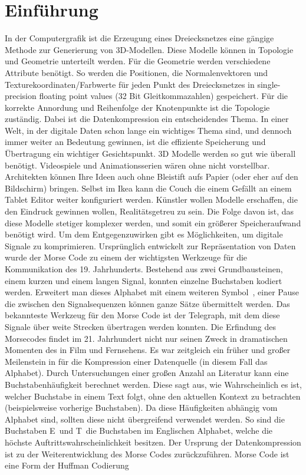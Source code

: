 \section{Einführung}

In der Computergrafik ist die Erzeugung eines Dreiecksnetzes eine gängige Methode zur Generierung von 3D-Modellen. Diese Modelle können in Topologie und Geometrie unterteilt werden. Für die Geometrie werden verschiedene Attribute benötigt. 
So werden die Positionen, die Normalenvektoren und Texturekoordinaten/Farbwerte für jeden Punkt des Dreiecksnetzes in single-precision floating point values (32 Bit Gleitkommazahlen) gespeichert. 
Für die korrekte Annordung und Reihenfolge der Knotenpunkte ist die Topologie zuständig. 
Dabei ist die Datenkompression ein entscheidendes Thema. 
In einer Welt, in der digitale Daten schon lange ein wichtiges Thema sind, und dennoch immer weiter an Bedeutung gewinnen, ist die effiziente Speicherung und Übertragung ein wichtiger Gesichtspunkt.
3D Modelle werden so gut wie überall benötigt. Videospiele und Animationsserien wären ohne nicht vorstellbar. Architekten können Ihre Ideen auch ohne Bleistift aufs Papier (oder eher auf den Bildschirm) bringen. Selbst im Ikea kann die Couch die einem Gefällt an einem Tablet Editor weiter konfiguriert werden.
Künstler wollen Modelle erschaffen, die den Eindruck gewinnen wollen, Realitätsgetreu zu sein. 
Die Folge davon ist, das diese Modelle stetiger komplexer werden, und somit ein größerer Speicheraufwand benötigt wird. 
Um dem Entgegenzuwirken gibt es Möglichkeiten, um digitale Signale zu komprimieren. 
Ursprünglich entwickelt zur Repräsentation von Daten wurde der Morse Code zu einem der wichtigsten Werkzeuge für die Kommunikation des 19. Jahrhunderts. Bestehend aus zwei Grundbausteinen, einem kurzen und einem langen Signal, konnten einzelne Buchstaben kodiert werden. Erweitert man dieses Alphabet mit einem weiteren \glqq Symbol\grqq\ , einer Pause die zwischen den Signalsequenzen können ganze Sätze übermittelt werden. Das bekannteste Werkzeug für den Morse Code ist der Telegraph, mit dem diese Signale über weite Strecken übertragen werden konnten.
Die Erfindung des Morsecodes findet im 21. Jahrhundert nicht nur seinen Zweck in dramatischen Momenten des in Film und Fernsehens. Es war zeitgleich ein früher und großer Meilenstein in für die Kompression einer Datenquelle (in diesem Fall das Alphabet). Durch Untersuchungen einer großen Anzahl an Literatur kann eine Buchstabenhäufigkeit berechnet werden. Diese sagt aus, wie Wahrscheinlich es ist, welcher Buchstabe in einem Text folgt, ohne den aktuellen Kontext zu betrachten (beispielsweise vorherige Buchstaben). Da diese Häufigkeiten abhängig vom Alphabet sind, sollten diese nicht übergreifend verwendet werden. So sind die Buchstaben \glqq E\grqq\ und \glqq T\grqq\ die Buchstaben im Englischen Alphabet, welche die höchste Auftrittswahrscheinlichkeit besitzen. 
Der Ursprung der Datenkompression ist zu der Weiterentwicklung des Morse Codes zurückzuführen. 
Morse Code ist eine Form der Huffman Codierung

